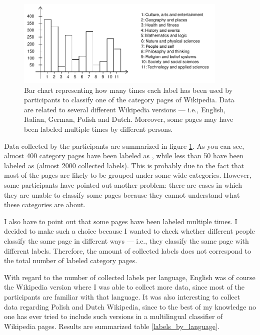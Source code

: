             \begin{figure}
                \centering
                \includegraphics[width=0.9\textwidth]{images/data_histogram.pdf}
                \caption{Bar chart representing how many times each label has been used by participants to classify one of the category pages of Wikipedia. Data are related to several different Wikipedia versions --- i.e., English, Italian, German, Polish and Dutch. Moreover, some pages may have been labeled multiple times by different persons.}
                \label{data_histogram}
            \end{figure}
            
            Data collected by the participants are summarized in figure \ref{data_histogram}. As you can see, almost 400 category pages have been labeled as , while less than 50 have been labeled as  (almost 2000 collected labels). This is probably due to the fact that most of the pages are likely to be grouped under some wide categories. However, some participants have pointed out another problem: there are cases in which they are unable to classify some pages because they cannot understand what these categories are about.
            
            I also have to point out that some pages have been labeled multiple times. I decided to make such a choice because I wanted to check whether different people classify the same page in different ways --- i.e., they classify the same page with different labels. Therefore, the amount of collected labels does not correspond to the total number of labeled category pages.
            
            With regard to the number of collected labels per language, English was of course the Wikipedia version where I was able to collect more data, since most of the participants are familiar with that language. It was also interesting to collect data regarding Polish and Dutch Wikipedia, since to the best of my knowledge no one has ever tried to include such versions in a multilingual classifier of Wikipedia pages. Results are summarized table \ref{labels_by_language}.
            
